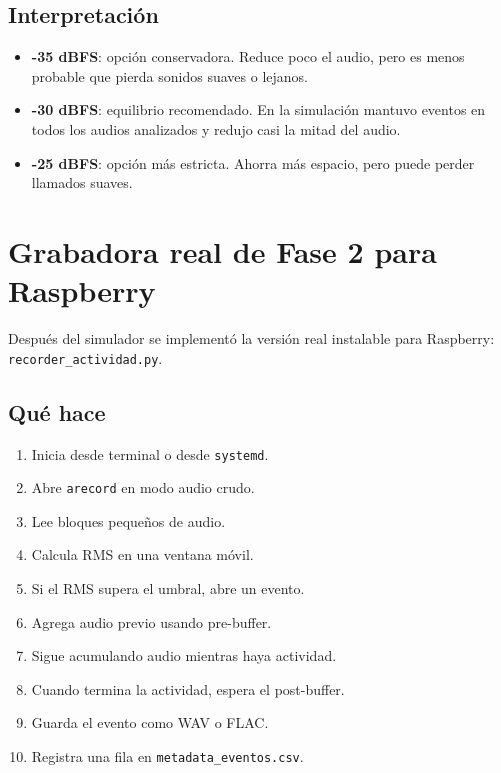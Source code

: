 \documentclass[11pt,letterpaper]{article}
\newcommand{\archivo}[1]{\texttt{#1}}
\begin{document}
\subsection{Interpretación}

\begin{itemize}[leftmargin=*]
  \item \textbf{-35 dBFS}: opción conservadora. Reduce poco el audio, pero es menos probable que pierda sonidos suaves o lejanos.
  \item \textbf{-30 dBFS}: equilibrio recomendado. En la simulación mantuvo eventos en todos los audios analizados y redujo casi la mitad del audio.
  \item \textbf{-25 dBFS}: opción más estricta. Ahorra más espacio, pero puede perder llamados suaves.
\end{itemize}

\section{Grabadora real de Fase 2 para Raspberry}

Después del simulador se implementó la versión real instalable para Raspberry: \archivo{recorder\_actividad.py}.

\subsection{Qué hace}

\begin{enumerate}[leftmargin=*]
  \item Inicia desde terminal o desde \archivo{systemd}.
  \item Abre \archivo{arecord} en modo audio crudo.
  \item Lee bloques pequeños de audio.
  \item Calcula RMS en una ventana móvil.
  \item Si el RMS supera el umbral, abre un evento.
  \item Agrega audio previo usando pre-buffer.
  \item Sigue acumulando audio mientras haya actividad.
  \item Cuando termina la actividad, espera el post-buffer.
  \item Guarda el evento como WAV o FLAC.
  \item Registra una fila en \archivo{metadata\_eventos.csv}.
\end{enumerate}
\end{document}
